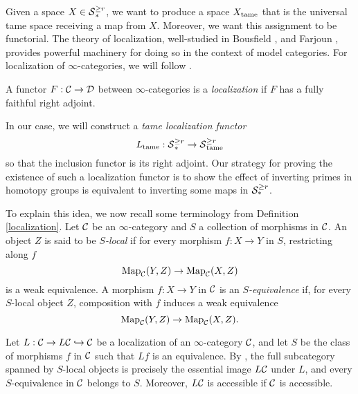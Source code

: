     
Given a space $X\in \operatorname{\mathcal{S}}^{\geq r}_{*}$, we want to produce a space $X_{\operatorname{\operatorname{tame}}}$ that is the universal tame space receiving a map from $X$. Moreover, we want this assignment to be functorial. The theory of localization, well-studied in Bousfield \cite{BousfieldSpaces}, \cite{BousfieldSpectra} and Farjoun \cite{Farjoun}, provides powerful machinery for doing so in the context of model categories.
For localization of $\infty$-categories, we will follow \cite{HTT}.
\begin{definition}
    \cite[Definition 5.2.7.2.]{HTT}
    A functor $F:{\mathcal{C}}\to {\mathcal{D}}$ between $\infty$-categories is a \emph{localization} if $F$ has a fully faithful right adjoint.
\end{definition}
In our case, we will construct a \emph{tame localization functor}
$$
L_{\operatorname{\operatorname{tame}}}: \operatorname{\mathcal{S}}^{\geq r}_* \to \operatorname{\mathcal{S}}^{\geq r}_{\operatorname{\operatorname{tame}}}
$$
so that the inclusion functor is its right adjoint.
Our strategy for proving the existence of such a localization functor is to show the effect of inverting primes in homotopy groups is equivalent to inverting some maps in ${\mathcal{S}}^{\geq r}_{*}$.

To explain this idea, we now recall some terminology from Definition \ref{localization}. 
Let ${\mathcal{C}}$ be an $\infty$-category and $S$ a collection of morphisms in ${\mathcal{C}}$.
An object $Z$ is said to be \emph{$S$-local} if for every morphism $f:X\to Y$ in $S$, restricting along $f$ 
$$
\operatorname{Map}_{{\mathcal{C}}}(Y,Z) \to \operatorname{Map}_{{\mathcal{C}}}(X,Z)
$$
is a weak equivalence.
A morphism $f:X\to Y$ in ${\mathcal{C}}$ is an \emph{$S$-equivalence} if, for every $S$-local object $Z$, composition with $f$ induces a weak equivalence 
$$
\operatorname{Map}_{{\mathcal{C}}}(Y,Z) \to \operatorname{Map}_{{\mathcal{C}}}(X,Z).
$$
\begin{remark}
    Let $L:{\mathcal{C}} \to L{\mathcal{C}} \hookrightarrow {\mathcal{C}}$ be a localization of an $\infty$-category ${\mathcal{C}}$, and let $S$ be the class of morphisms $f$ in ${\mathcal{C}}$ such that $Lf$ is an equivalence.
    By \cite[Proposition 5.5.4.2.]{HTT}, the full subcategory spanned by $S$-local objects is precisely the essential image $L{\mathcal{C}}$ under $L$, and every $S$-equivalence in ${\mathcal{C}}$ belongs to $S$. Moreover,  $L{\mathcal{C}}$ is accessible if ${\mathcal{C}}$ is accessible.
\end{remark}

